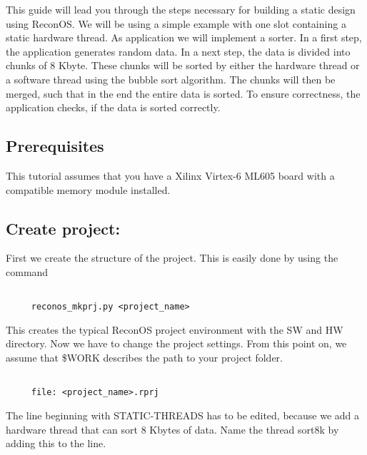 \documentclass[DIV15,a4paper]{scrartcl}
\begin{document}
This guide will lead you through the steps necessary for building a static design using ReconOS. We will be using a simple example with one slot containing a static hardware thread. As application we will implement a sorter. In a first step, the application generates random data. In a next step, the data is divided into chunks of 8 Kbyte. These chunks will be sorted by either the hardware thread or a software thread using the bubble sort algorithm. The chunks will then be merged, such that in the end the entire data is sorted. To ensure correctness, the application checks, if the data is sorted correctly.

\subsection{Prerequisites}

This tutorial assumes that you have a Xilinx
Virtex-6 ML605 board with a compatible memory module installed.

\subsection*{Create project:}

First we create the structure of the project. This is easily done by using the command

\begin{verbatim}

     reconos_mkprj.py <project_name>

\end{verbatim}
     
This creates the typical ReconOS project environment with the SW and HW directory. Now we have to change the project settings.
From this point on, we assume that \$WORK describes the path to your project folder.

\begin{verbatim}

     file: <project_name>.rprj

\end{verbatim}
     
The line beginning with STATIC-THREADS has to be edited, because we add a hardware thread that can sort 8 Kbytes of data. Name the thread sort8k by adding this to the line.
\end{document}
